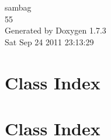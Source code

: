 \documentclass[a4paper]{book}
\begin{document}
\hypersetup{pageanchor=false}
\begin{titlepage}
\vspace*{7cm}
\begin{center}
{\Large sambag \\[1ex]\large 55 }\\
\vspace*{1cm}
{\large Generated by Doxygen 1.7.3}\\
\vspace*{0.5cm}
{\small Sat Sep 24 2011 23:13:29}\\
\end{center}
\end{titlepage}
\clearemptydoublepage
{}
\tableofcontents
\clearemptydoublepage
{}
\hypersetup{pageanchor=true}
\chapter{Class Index}

\chapter{Class Index}

\end{document}
